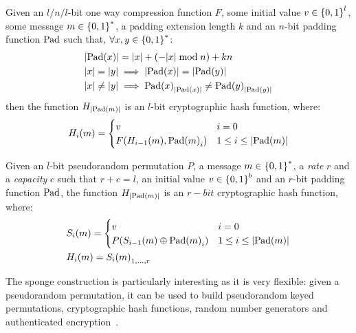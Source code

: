 \begin{proposition}
	Given an \(l/n/l\)-bit one way compression function \(F\), some initial value 
	\(v \in \left\{0, 1\right\}^{l}\), some message \(m \in \left\{0, 1\right\}^*\), a padding extension length \(k\) 
	and an \(n\)-bit padding function \(\mathrm{Pad} \) such that, 
	\(\forall x, y \in \left\{0, 1\right\}^{*}\):
	\begin{align*}
    & \abs{\call{\Pad}{x}} = \abs{x} + \Parens*{-\abs{x} \bmod n} + kn \\
		& \abs{x} = \abs{y} \implies \abs{\call{\Pad}{x}} = \abs{\call{\Pad}{y}} \\
    & \abs{x} \neq \abs{y} \implies 
			\call{\Pad}{x}_{\abs{\call{\Pad}{x}}} \neq \call{\Pad}{y}_{\abs{\call{\Pad}{y}}}
  \end{align*}
	then the function \(H_{\left\lvert\mathrm{Pad}\left(m\right)\right\rvert}\) is an \(l\)-bit cryptographic hash function, 
	where:
	\[
		\call{H_{i}}{m} =
		\begin{cases}
			v                                               & i = 0   \\
			\call{F}{\call{H_{i-1}}{m}, \call{\Pad}{m}_{i}} & 1 \le i \le \abs{\call{\Pad}{m}}
		\end{cases}
	\]
\end{proposition}

\begin{proposition}
	Given an \(l\)-bit pseudorandom permutation \(P\), a message \(m \in \left\{0, 1\right\}^{*}\), a 
	\emph{rate} \(r\) and a \emph{capacity} \(c\) such that \(r + c = l\), an initial value 
	\(v \in \left\{0, 1\right\}^b\) and an \(r\)-bit padding function \(\mathrm{Pad} \), the 
	function \(H_{\left\lvert\mathrm{Pad}\left(m\right)\right\rvert}\) is an \(r-bit\) cryptographic hash function, where:
	\begin{align*}
		& \call{S_{i}}{m} = 
		\begin{cases}
			v & i = 0 \\
			\call{P}{\call{S_{i-1}}{m} \oplus \call{\Pad}{m}_i} & 1 \le i \le \abs{\call{\Pad}{m}}
		\end{cases} \\
		& \call{H_{i}}{m} = \call{S_{i}}{m}_{1,\dots,r}
	\end{align*}
\end{proposition}

The sponge construction is particularly interesting as it is very flexible: given a pseudorandom 
permutation, it can be used to build pseudorandom keyed permutations, cryptographic hash functions, 
random number generators and authenticated encryption~\cite{BertoniDPA2012}.

